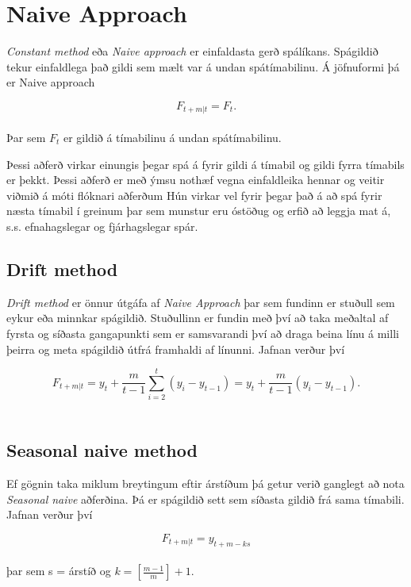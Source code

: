 \section{Naive Approach}
\textit{Constant method} eða \textit{Naive approach} er einfaldasta gerð spálíkans. Spágildið tekur einfaldlega það gildi sem mælt var á undan spátímabilinu. Á jöfnuformi þá er Naive approach

$$F_{t+m|t} = F_t.$$\\

Þar sem $F_t$ er gildið á tímabilinu á undan spátímabilinu.

Þessi aðferð virkar einungis þegar spá á fyrir gildi á tímabil og gildi fyrra tímabils er þekkt.
Þessi aðferð er með ýmsu nothæf vegna einfaldleika hennar og veitir viðmið á móti flóknari aðferðum Hún virkar vel fyrir þegar það á að spá fyrir næsta tímabil í greinum þar sem munstur eru óstöðug og erfið að leggja mat á, s.s. efnahagslegar og fjárhagslegar spár\cite{NaiveApproach}.

\subsection {Drift method}

\textit{Drift method} \cite{NaiveApproach2} er önnur útgáfa af \textit{Naive Approach} þar sem fundinn er stuðull sem eykur eða minnkar spágildið. Stuðullinn er fundin með því að taka meðaltal af fyrsta og síðasta gangapunkti sem er samsvarandi því að draga beina línu á milli þeirra og meta spágildið útfrá framhaldi af línunni. Jafnan verður því

$$F_{t+m|t} = y_t + \frac{m}{t-1}\displaystyle\sum_{i=2}^{t} (y_i-y_{t-1}) = y_t + \frac{m}{t-1}(y_i-y_{t-1}) .$$\\

\subsection{Seasonal naive method}
Ef gögnin taka miklum breytingum eftir árstíðum þá getur verið ganglegt að nota \textit{Seasonal naive} aðferðina. Þá er spágildið sett sem síðasta gildið frá sama tímabili. Jafnan verður því

$$ F_{t+m|t} = y_{t+m-ks} $$\\

þar sem s = árstíð og $k = [\frac{m-1}{m}]+1$.